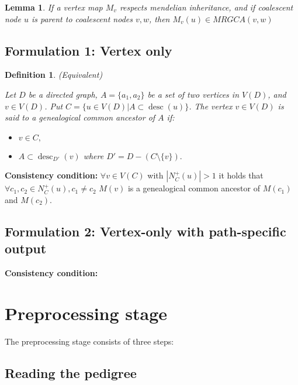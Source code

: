 \documentclass[14pt]{extarticle}
\DeclareMathOperator{\desc}{desc}
\newtheorem{definition}{Definition}
\newtheorem{lemma}{Lemma}
\begin{document}
\begin{lemma}
If a vertex map $M_v$ respects mendelian inheritance, and if coalescent node $u$ is parent to coalescent nodes $v, w$, then $M_v(u) \in MRGCA(v,w)$   
\end{lemma}



 

\subsection{Formulation 1: Vertex only} 

\begin{definition} (Equivalent)
	
	Let $D$ be a directed graph, $A = \{a_1,  a_2\}$ be a set of two vertices in $V(D)$, and $v \in V(D)$. Put $C = \{u \in V(D) | A \subset \desc(u) \}$. The vertex $v \in V(D)$ is said to a genealogical common ancestor of $A$ if:
	
	\begin{itemize}
		\item 
		$v \in C,$
		\item 
		$A \subset \desc_{D'}(v)$ where $D' = D -  (C \setminus \{v\}).$
	\end{itemize}
	
\end{definition}



\textbf{Consistency condition:}  $\forall v \in V(C)$ with $|N^{+}_C(u)| > 1$ it holds that $\forall c_1, c_2 \in N^{+}_C(u), c_1 \ne c_2$ $M(v)$ is a genealogical common ancestor of $M(c_1)$ and $M(c_2)$.


\subsection{Formulation 2: Vertex-only with path-specific output}

\textbf{Consistency condition:} 

\section{Preprocessing stage}

The preprocessing stage consists of three steps:

\subsection{Reading the pedigree}
\end{document}
